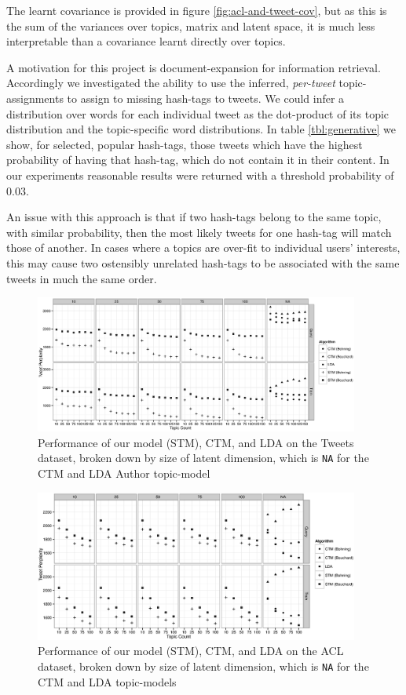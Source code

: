 The learnt covariance is provided in figure \ref{fig:acl-and-tweet-cov}, but as this is the sum of the variances over topics, matrix and latent space, it is much less interpretable than a covariance learnt directly over topics.

A motivation for this project is document-expansion for information retrieval. Accordingly we investigated the ability to use the inferred, \emph{per-tweet} topic-assignments to assign to missing hash-tags to tweets. We could infer a distribution over words for each individual tweet as the dot-product of its topic distribution and the topic-specific word distributions. 
In table \ref{tbl:generative} we show, for selected, popular hash-tags, those tweets which have the highest probability of having that hash-tag, which do not contain it in their content. In our experiments reasonable results were returned with a threshold probability of 0.03.

An issue with this approach is that if two hash-tags belong to the same topic, with similar probability, then the most likely tweets for one hash-tag will match those of another. In cases where a topics are over-fit to individual users' interests, this may cause two ostensibly unrelated hash-tags to be associated with the same tweets in much the same order.

\begin{figure}
\centering
    \includegraphics[width=0.95\textwidth]{plots/tweet-all.eps}
    \caption{Performance of our model (STM), CTM, and LDA on the Tweets dataset, broken down by size of latent dimension, which is {\tt NA} for the CTM and LDA Author topic-model}
    \label{fig:tweet-all}
\end{figure}

\begin{figure}
\centering
    \includegraphics[width=0.95\textwidth]{plots/acl-all.eps}
    \caption{Performance of our model (STM), CTM, and LDA on the ACL dataset, broken down by size of latent dimension, which is {\tt NA} for the CTM and LDA topic-models}
    \label{fig:acl-all}
\end{figure}


